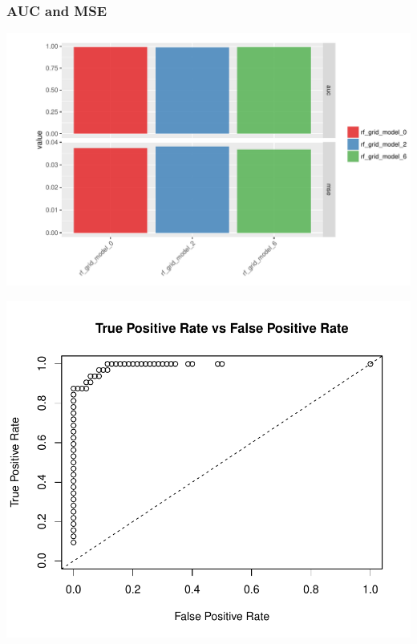 \documentclass[handout, c, 11pt, xcolor=svgnames, hyperref={colorlinks,citecolor=DeepPink4,linkcolor=DarkRed,urlcolor=DarkBlue}]{beamer} %
\begin{document}
\begin{frame}
	\frametitle{AUC and MSE}
	
	\begin{center}\includegraphics[width=1\textwidth]{webinar_code_files/figure-latex/unnamed-chunk-29-1.pdf} \end{center}
	
	\begin{center}\includegraphics[width=1\textwidth]{webinar_code_files/figure-latex/unnamed-chunk-42-1} \end{center}
\end{frame}
\end{document}
